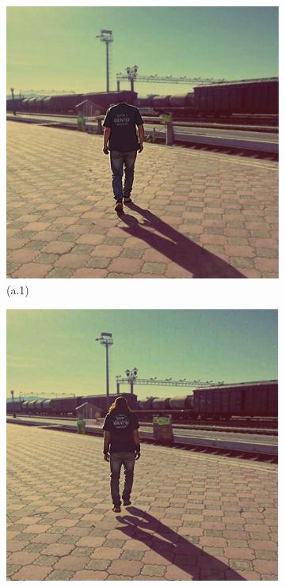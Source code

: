 \documentclass{article}
\begin{document}
\begin{figure}[htbp]
    \centering
    \begin{subfigure}[b]{0.2\textwidth}
        \includegraphics[width=\linewidth]{figures/tm/image1.png}
        \caption*{(a.1)}
    \end{subfigure}
    \begin{subfigure}[b]{0.2\textwidth}
        \includegraphics[width=\linewidth]{figures/tm/image2.png}

\end{subfigure}
\end{figure}
\end{document}
